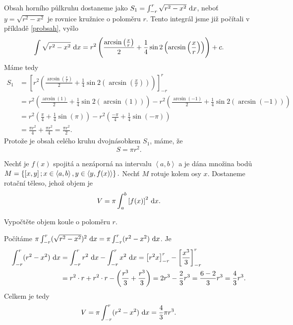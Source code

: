 \begin{reseni}
Obsah horního půlkruhu dostaneme jako $S_1 = \int_{-r}^r \sqrt{r^2-x^2}\, \mathop{}\!\mathrm{d} x$, neboť
$y = \sqrt{r^2-x^2}$ je rovnice kružnice o poloměru $r$. Tento integrál jsme již počítali v příkladě \ref{probsah},
vyšlo
$$
    \int \sqrt{r^2-x^2}\, \mathop{}\!\mathrm{d} x = r^2 \left( \frac{\arcsin \left( \frac{x}{r} \right ) }{2} + \frac{1}{4} \sin 2 \left( \arcsin \left( \frac{x}{r} \right ) \right )  \right )   + c.
$$
Máme tedy
\begin{align*}
S_1 &= \left [ r^2 \left( \frac{\arcsin \left( \frac{x}{r} \right ) }{2} + \frac{1}{4} \sin 2 \left( \arcsin \left( \frac{x}{r} \right ) \right )  \right ) \right ] _{-r}^{r} \\
&=r^2 \left( \frac{\arcsin \left( 1 \right ) }{2} + \frac{1}{4} \sin 2 \left( \arcsin \left( 1 \right ) \right )  \right )  - r^2 \left( \frac{\arcsin \left( -1 \right ) }{2} + \frac{1}{4} \sin 2 \left( \arcsin \left( -1 \right ) \right )  \right )\\
&= r^2 \left( \frac{\pi }{4} + \frac{1}{4} \sin (\pi)  \right )  - r^2 \left( \frac{-\pi}{4} + \frac{1}{4} \sin (-\pi)  \right ) \\
&= \frac{\pi r^2}{4} +\frac{\pi r^2}{4} = \frac{\pi r^2}{2}.
\end{align*}
Protože je obsah celého kruhu dvojnásobkem $S_1$, máme, že
$$
    S = \pi r^2.
$$
\end{reseni}

\begin{pozn}
    Nechť je $f(x)$ spojitá a nezáporná na intervalu $\left<  a,b \right>$ a je
    dána množina bodů
    $M=\left \{ \left [ x,y \right ]; x \in \left<  a,b \right>,\linebreak y \in \left<  y, f(x) \right>    \right \} .$
    Nechť $M$ rotuje kolem osy $x$. Dostaneme rotační těleso, jehož objem je
    $$V=\pi \int _a^b \left [ f(x) \right ]^2 \, \mathop{}\!\mathrm{d} x. $$
\end{pozn}

\begin{priklad}
Vypočtěte objem koule o poloměru $r$.
\end{priklad}

\begin{reseni}
Počítáme $\pi\int _{-r}^r(\sqrt{r^2-x^2} )^2 \, \mathop{}\!\mathrm{d} x=\pi\int_{-r}^r(r^2-x^2)\, \mathop{}\!\mathrm{d} x$. Je
\begin{align*}
	\int_{-r}^r (r^2-x^2)\, \mathop{}\!\mathrm{d} x &= \int_{-r}^r r^2 \, \mathop{}\!\mathrm{d} x - \int_{-r}^r x^2 \, \mathop{}\!\mathrm{d} x = \left [ r^2 x \right ]_{-r}^r - \left [ \frac{x^3}{3} \right ]_{-r}^r \\
	&= r^2 \cdot r + r^2 \cdot r -\left( \frac{r^3}{3} + \frac{r^3 }{3} \right ) = 2r^3 - \frac{2}{3} r^3 = \frac{6-2}{3} r^3 = \frac{4}{3 }r^3.
\end{align*}
Celkem je tedy
$$V = \pi \int_{-r}^r (r^2-x^2)\, \mathop{}\!\mathrm{d} x = \frac{4}{3}\pi r^3.$$
\end{reseni}

